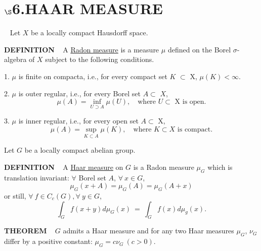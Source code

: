 \chapter{
$\boldsymbol{\S}$\textbf{6}.\quad  HAAR MEASURE}
\setlength\parindent{2em}
\setcounter{theoremn}{0}

\ \indent 
Let $X$ be a locally compact Hausdorff space.

\vspace{0.25cm}

\begin{x}{\small\bf DEFINITION} \ %
A 
\underline{Radon measure}
is a measure $\mu$ defined on the Borel $\sigma$-algebra of $X$ subject to the following conditions.

\vspace{0.1cm}

1.  $\mu$ is finite on compacta, i.e., for every compact set $K$ $\subset$ X, $\mu(K) < \infty$.

\vspace{0.1cm}

2.  $\mu$ is outer regular, i.e., for every Borel set $A \subset$ $X$, 
\[
\mu(A) = \inf_{U\supset A} \mu(U),	 \quad \text{where $U \subset$ X is open.}
\]

3.  $\mu$ is inner regular, i.e., for every open set $A \subset$ X, 
\[
\mu(A) = \sup_{K\subset A} \mu(K),	 \quad \text{where $K \subset X$ is compact.}
\]
\end{x}

\vspace{0.1cm}

Let $G$ be a locally compact abelian group.

\vspace{0.2cm}

\begin{x}{\small\bf DEFINITION} \ %
A 
\underline{Haar measure}
on $G$ is a Radon measure $\mu_{G}$ which is translation invariant: 
$\forall$ Borel set $A$, $\forall \ x \in G$,
\[
\mu_G(x+A) = \mu_G(A) = \mu_G(A+x)
\]
or still, $\forall \ f \in C_c(G), \forall \ y \in G$,
\[
\int_Gf(x+y)d\mu_G(x) \ = \  \int_Gf(x)d\mu_g(x).
\]
\end{x}

\vspace{0.1cm}

\begin{x}{\small\bf THEOREM} \ %
$G$ admits a Haar measure and for any two Haar measures $\mu_G$,  $\nu_G$ differ by a positive constant: 
$\mu_G  = c\nu_G  \ (c > 0)$.
\end{x}

